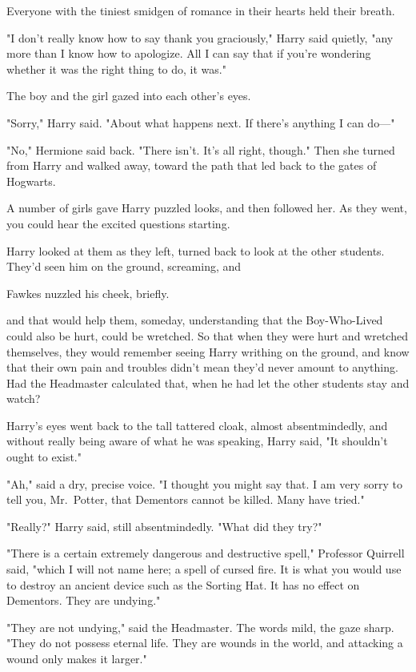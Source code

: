 Everyone with the tiniest smidgen of romance in their hearts held their breath.

"I don't really know how to say thank you graciously," Harry said quietly, "any
more than I know how to apologize. All I can say that if you're wondering
whether it was the right thing to do, it was."

The boy and the girl gazed into each other's eyes.

"Sorry," Harry said. "About what happens next. If there's anything I can do\mbox{---}"

"No," Hermione said back. "There isn't. It's all right, though." Then she
turned from Harry and walked away, toward the path that led back to the gates
of Hogwarts.

A number of girls gave Harry puzzled looks, and then followed her. As they
went, you could hear the excited questions starting.

Harry looked at them as they left, turned back to look at the other students.
They'd seen him on the ground, screaming, and{\el}

Fawkes nuzzled his cheek, briefly.

{\el} and that would help them, someday, understanding that the Boy-Who-Lived
could also be hurt, could be wretched. So that when they were hurt and wretched
themselves, they would remember seeing Harry writhing on the ground, and know
that their own pain and troubles didn't mean they'd never amount to anything.
Had the Headmaster calculated that, when he had let the other students stay and
watch?

Harry's eyes went back to the tall tattered cloak, almost absentmindedly, and
without really being aware of what he was speaking, Harry said, "It shouldn't
ought to exist."

"Ah," said a dry, precise voice. "I thought you might say that. I am very sorry
to tell you, Mr.~Potter, that Dementors cannot be killed. Many have tried."

"Really?" Harry said, still absentmindedly. "What did they try?"

"There is a certain extremely dangerous and destructive spell," Professor
Quirrell said, "which I will not name here; a spell of cursed fire. It is what
you would use to destroy an ancient device such as the Sorting Hat. It has no
effect on Dementors. They are undying."

"They are not undying," said the Headmaster. The words mild, the gaze sharp.
"They do not possess eternal life. They are wounds in the world, and attacking
a wound only makes it larger."

